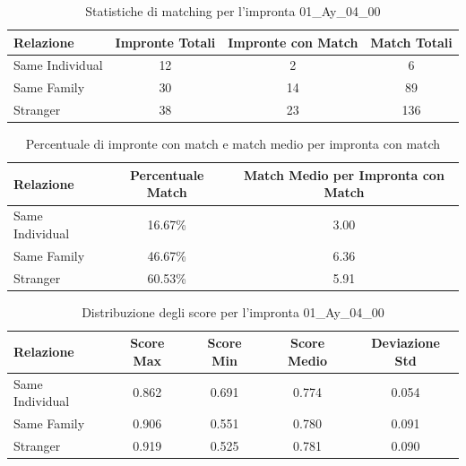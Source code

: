 \begin{table}[htbp]
\centering
\caption{Statistiche di matching per l'impronta 01\_Ay\_04\_00}
\label{tab:results_01_Ay_04_00}
\begin{tabular}{|l|c|c|c|}
\hline
\textbf{Relazione} & \textbf{Impronte Totali} & \textbf{Impronte con Match} & \textbf{Match Totali} \\
\hline
Same Individual & 12 & 2 & 6 \\
\hline
Same Family & 30 & 14 & 89 \\
\hline
Stranger & 38 & 23 & 136 \\
\hline
\end{tabular}
\end{table}


\begin{table}[htbp]
\centering
\caption{Percentuale di impronte con match e match medio per impronta con match}
\label{tab:match_percentage_01_Ay_04_00}
\begin{tabular}{|l|c|c|}
\hline
\textbf{Relazione} & \textbf{Percentuale Match} & \textbf{Match Medio per Impronta con Match} \\
\hline
Same Individual & 16.67\% & 3.00 \\
\hline
Same Family & 46.67\% & 6.36 \\
\hline
Stranger & 60.53\% & 5.91 \\
\hline
\end{tabular}
\end{table}


\begin{table}[htbp]
\centering
\caption{Distribuzione degli score per l'impronta 01\_Ay\_04\_00}
\label{tab:scores_01_Ay_04_00}
\begin{tabular}{|l|c|c|c|c|}
\hline
\textbf{Relazione} & \textbf{Score Max} & \textbf{Score Min} & \textbf{Score Medio} & \textbf{Deviazione Std} \\
\hline
Same Individual & 0.862 & 0.691 & 0.774 & 0.054 \\
\hline
Same Family & 0.906 & 0.551 & 0.780 & 0.091 \\
\hline
Stranger & 0.919 & 0.525 & 0.781 & 0.090 \\
\hline
\end{tabular}
\end{table}

